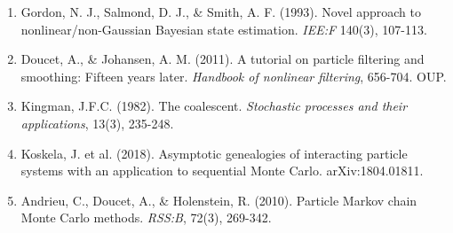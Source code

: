 \documentclass[final, 12pt]{beamer}
\newlength{\colwidth}
\begin{document}
\begin{frame}
\begin{columns}
\begin{column}{\colwidth}
\begin{block}
\small{
\begin{enumerate}
\item Gordon, N. J., Salmond, D. J., \& Smith, A. F. (1993). Novel approach to nonlinear/non-Gaussian Bayesian state estimation. \textit{IEE:F} 140(3), 107-113.
\item Doucet, A., \& Johansen, A. M. (2011). A tutorial on particle filtering and smoothing: Fifteen years later. \textit{Handbook of nonlinear filtering}, 656-704. OUP.
\item Kingman, J.F.C. (1982). The coalescent. \textit{Stochastic processes and their applications}, 13(3), 235-248.
\item Koskela, J. et al. (2018).  Asymptotic genealogies of interacting particle systems with an application to sequential Monte Carlo. arXiv:1804.01811.
\item Andrieu, C., Doucet, A., \& Holenstein, R. (2010). Particle Markov chain Monte Carlo methods. \textit{RSS:B}, 72(3), 269-342.
\end{enumerate}
}
\end{block}

\end{column}
\end{columns}

\end{frame}
\end{document}
